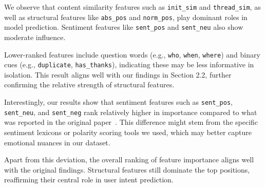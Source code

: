 \documentclass{article}
\begin{document}
We observe that content similarity features such as \texttt{init\_sim} and \texttt{thread\_sim}, as well as structural features like \texttt{abs\_pos} and \texttt{norm\_pos}, play dominant roles in model prediction. Sentiment features like \texttt{sent\_pos} and \texttt{sent\_neu} also show moderate influence.

Lower-ranked features include question words (e.g., \texttt{who}, \texttt{when}, \texttt{where}) and binary cues (e.g., \texttt{duplicate}, \texttt{has\_thanks}), indicating these may be less informative in isolation. This result aligns well with our findings in Section 2.2, further confirming the relative strength of structural features.

Interestingly, our results show that sentiment features such as \texttt{sent\_pos}, \texttt{sent\_neu}, and \texttt{sent\_neg} rank relatively higher in importance compared to what was reported in the original paper~\cite{qu2019user}. This difference might stem from the specific sentiment lexicons or polarity scoring tools we used, which may better capture emotional nuances in our dataset.

Apart from this deviation, the overall ranking of feature importance aligns well with the original findings. Structural features still dominate the top positions, reaffirming their central role in user intent prediction.
\end{document}
